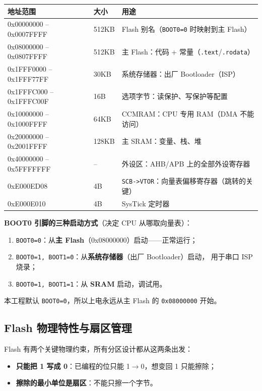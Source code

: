 \begin{tabular}{lll}
\toprule
\textbf{地址范围} & \textbf{大小} & \textbf{用途} \\
\midrule
0x00000000 -- 0x0007FFFF & 512KB & Flash 别名（\texttt{BOOT0=0} 时映射到主 Flash） \\
0x08000000 -- 0x0807FFFF & 512KB & 主 Flash：代码 + 常量（\texttt{.text}/\texttt{.rodata}） \\
0x1FFF0000 -- 0x1FFF77FF & 30KB & 系统存储器：出厂 Bootloader（ISP） \\
0x1FFFC000 -- 0x1FFFC00F & 16B & 选项字节：读保护、写保护等配置 \\
0x10000000 -- 0x1000FFFF & 64KB & CCMRAM：CPU 专用 RAM（DMA 不能访问） \\
0x20000000 -- 0x2001FFFF & 128KB & 主 SRAM：变量、栈、堆 \\
0x40000000 -- 0x5FFFFFFF & -- & 外设区：AHB/APB 上的全部外设寄存器 \\
0xE000ED08 & 4B & \texttt{SCB->VTOR}：向量表偏移寄存器（跳转的关键） \\
0xE000E010 & 4B & SysTick 定时器 \\
\bottomrule
\end{tabular}

\textbf{BOOT0 引脚的三种启动方式}（决定 CPU 从哪取向量表）：

\begin{enumerate}
  \item \texttt{BOOT0=0}：从\textbf{主 Flash}（0x08000000）启动——正常运行；
  \item \texttt{BOOT0=1, BOOT1=0}：从\textbf{系统存储器}（出厂 Bootloader）启动，
        用于串口 ISP 烧录；
  \item \texttt{BOOT0=1, BOOT1=1}：从 \textbf{SRAM} 启动，调试用。
\end{enumerate}

本工程默认 \texttt{BOOT0=0}，所以上电永远从主 Flash 的 \texttt{0x08000000}
开始。

\subsection{Flash 物理特性与扇区管理}

Flash 有两个关键物理约束，所有分区设计都从这两条出发：

\begin{itemize}
  \item \textbf{只能把 1 写成 0}：已编程的位只能 1$\to$0，想变回 1
        只能擦除；
  \item \textbf{擦除的最小单位是扇区}：不能只擦一个字节。
\end{itemize}

